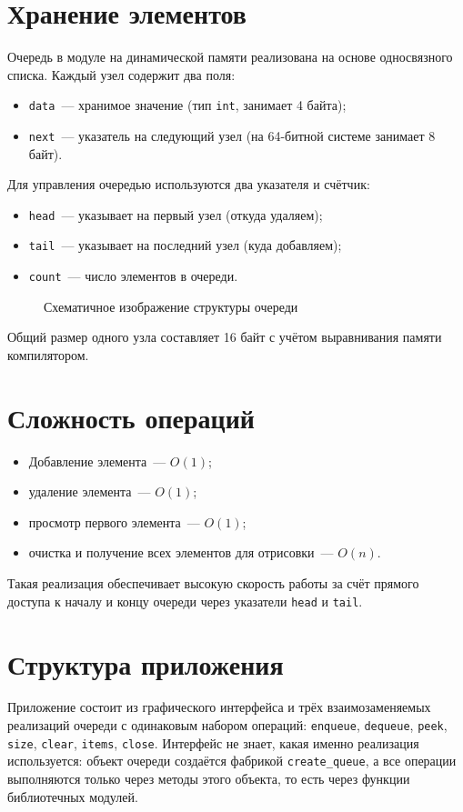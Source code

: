 \documentclass[oneside,a4paper,14pt]{extarticle} %
\begin{document}
\section{Хранение элементов}
Очередь в модуле на динамической памяти реализована на основе односвязного списка. Каждый узел содержит два поля:
\begin{itemize}
\item \texttt{data}~--- хранимое значение (тип \texttt{int}, занимает 4 байта);
\item \texttt{next}~--- указатель на следующий узел (на 64-битной системе занимает 8 байт).
\end{itemize}
Для управления очередью используются два указателя и счётчик:
\begin{itemize}
\item \texttt{head}~--- указывает на первый узел (откуда удаляем);
\item \texttt{tail}~--- указывает на последний узел (куда добавляем);
\item \texttt{count}~--- число элементов в очереди.
\end{itemize}

\begin{figure}[H]\centering
\scalebox{0.82}{}
\caption{Схематичное изображение структуры очереди}
\end{figure}
Общий размер одного узла составляет 16 байт с учётом выравнивания памяти компилятором.

\section{Сложность операций}
\begin{itemize}
\item Добавление элемента~--- $O(1)$;
\item удаление элемента~--- $O(1)$;
\item просмотр первого элемента~--- $O(1)$;
\item очистка и получение всех элементов для отрисовки~--- $O(n)$.
\end{itemize}
Такая реализация обеспечивает высокую скорость работы за счёт прямого доступа к началу и концу очереди через указатели \texttt{head} и \texttt{tail}.

\clearpage
\section{Структура приложения}
Приложение состоит из графического интерфейса и трёх взаимозаменяемых реализаций очереди с одинаковым набором операций: \texttt{enqueue}, \texttt{dequeue}, \texttt{peek}, \texttt{size}, \texttt{clear}, \texttt{items}, \texttt{close}. Интерфейс не знает, какая именно реализация используется: объект очереди создаётся фабрикой \texttt{create\_queue}, а все операции выполняются только через методы этого объекта, то есть через функции библиотечных модулей.
\end{document}
